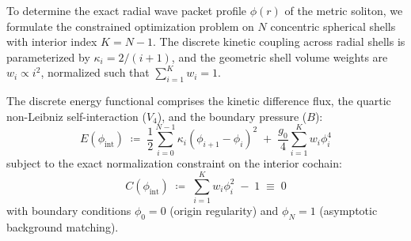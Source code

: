 \documentclass[
    12pt,
    a4paper,
    headings=normal,
    twoside=false,
    open=any,
    parskip=half
]{scrbook}
\begin{document}
To determine the exact radial wave packet profile $\phi(r)$ of the metric soliton, we formulate the constrained optimization problem on $N$ concentric spherical shells with interior index $K = N - 1$. The discrete kinetic coupling across radial shells is parameterized by $\kappa_i = 2/(i + 1)$, and the geometric shell volume weights are $w_i \propto i^2$, normalized such that $\sum_{i=1}^{K} w_i = 1$.

The discrete energy functional comprises the kinetic difference flux, the quartic non-Leibniz self-interaction ($V_4$), and the boundary pressure ($B$):
\begin{equation}
E(\phi_{\text{int}}) \;\coloneqq\; \frac{1}{2}\sum_{i=0}^{N-1} \kappa_i \left( \phi_{i+1} - \phi_i \right)^2 \;+\; \frac{g_0}{4}\sum_{i=1}^{K} w_i \phi_i^4
\label{eq:ch3_discrete_energy}
\end{equation}
subject to the exact normalization constraint on the interior cochain:
\begin{equation}
C(\phi_{\text{int}}) \;\coloneqq\; \sum_{i=1}^{K} w_i \phi_i^2 \;-\; 1 \;\equiv\; 0
\label{eq:ch3_kkt_constraint}
\end{equation}
with boundary conditions $\phi_0 = 0$ (origin regularity) and $\phi_N = 1$ (asymptotic background matching).
\end{document}
